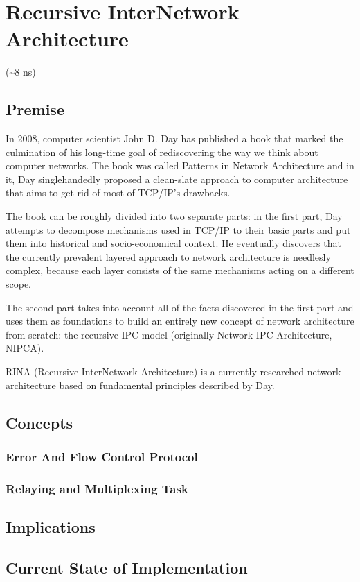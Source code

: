 \chapter{Recursive InterNetwork Architecture}
    (\textasciitilde8 ns)
    \section{Premise}
        In 2008, computer scientist John D. Day has published a book that marked the culmination of his long-time goal of rediscovering the way we think about computer networks. The book was called Patterns in Network Architecture and in it, Day singlehandedly proposed a clean-slate approach to computer architecture that aims to get rid of most of TCP/IP's drawbacks.

        The book can be roughly divided into two separate parts: in the first part, Day attempts to decompose mechanisms used in TCP/IP to their basic parts and put them into historical and socio-economical context. He eventually discovers that the currently prevalent layered approach to network architecture is needlesly complex, because each layer consists of the same mechanisms acting on a different scope.

        The second part takes into account all of the facts discovered in the first part and uses them as foundations to build an entirely new concept of network architecture from scratch: the recursive IPC model (originally Network IPC Architecture, NIPCA).

        RINA (Recursive InterNetwork Architecture) is a currently researched network architecture based on fundamental principles described by Day.

    \section{Concepts}
        \subsection{Error And Flow Control Protocol}
        \subsection{Relaying and Multiplexing Task}
    \section{Implications}
    \section{Current State of Implementation}
